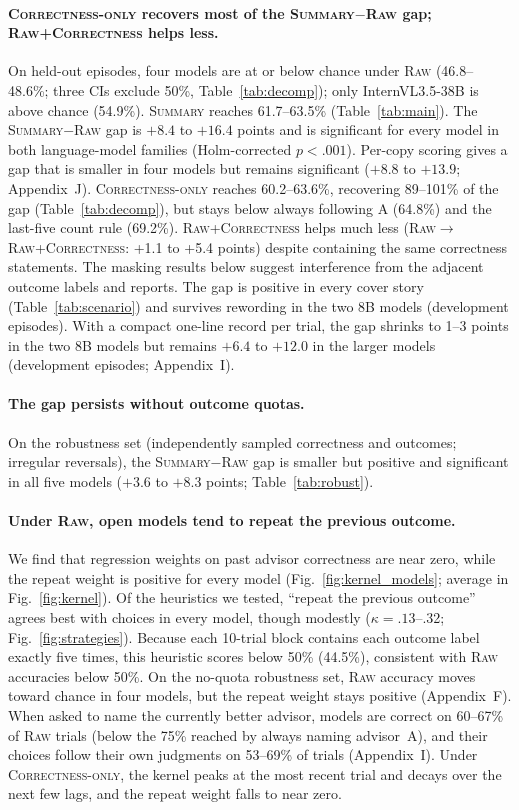 \documentclass[letterpaper]{article} %
\newcommand{\Raw}{\textsc{Raw}}
\newcommand{\RawCorrectness}{\textsc{Raw+Correctness}}
\newcommand{\CorrectnessOnly}{\textsc{Correctness-only}}
\newcommand{\Summary}{\textsc{Summary}}
\begin{document}
\paragraph{\CorrectnessOnly{} recovers most of the \Summary{}$-$\Raw{} gap; \RawCorrectness{} helps less.} On held-out episodes, four models are at or below chance under \Raw{} (46.8--48.6\%; three CIs exclude 50\%, Table~\ref{tab:decomp}); only InternVL3.5-38B is above chance (54.9\%). \Summary{} reaches 61.7--63.5\% (Table~\ref{tab:main}). The \Summary{}$-$\Raw{} gap is $+8.4$ to $+16.4$ points and is significant for every model in both language-model families (Holm-corrected $p<.001$). Per-copy scoring gives a gap that is smaller in four models but remains significant ($+8.8$ to $+13.9$; Appendix~J). \CorrectnessOnly{} reaches 60.2--63.6\%, recovering 89--101\% of the gap (Table~\ref{tab:decomp}), but stays below always following A (64.8\%) and the last-five count rule (69.2\%). \RawCorrectness{} helps much less (\Raw{}$\to$\RawCorrectness{}: +1.1 to +5.4 points) despite containing the same correctness statements. The masking results below suggest interference from the adjacent outcome labels and reports. The gap is positive in every cover story (Table~\ref{tab:scenario}) and survives rewording in the two 8B models (development episodes). With a compact one-line record per trial, the gap shrinks to 1--3 points in the two 8B models but remains $+6.4$ to $+12.0$ in the larger models (development episodes; Appendix~I).

\paragraph{The gap persists without outcome quotas.} On the robustness set (independently sampled correctness and outcomes; irregular reversals), the \Summary{}$-$\Raw{} gap is smaller but positive and significant in all five models ($+3.6$ to $+8.3$ points; Table~\ref{tab:robust}).

\paragraph{Under \Raw{}, open models tend to repeat the previous outcome.} We find that regression weights on past advisor correctness are near zero, while the repeat weight is positive for every model (Fig.~\ref{fig:kernel_models}; average in Fig.~\ref{fig:kernel}). Of the heuristics we tested, ``repeat the previous outcome'' agrees best with choices in every model, though modestly ($\kappa=.13$--.32; Fig.~\ref{fig:strategies}). Because each 10-trial block contains each outcome label exactly five times, this heuristic scores below 50\% (44.5\%), consistent with \Raw{} accuracies below 50\%. On the no-quota robustness set, \Raw{} accuracy moves toward chance in four models, but the repeat weight stays positive (Appendix~F). When asked to name the currently better advisor, models are correct on 60--67\% of \Raw{} trials (below the 75\% reached by always naming advisor~A), and their choices follow their own judgments on 53--69\% of trials (Appendix~I). Under \CorrectnessOnly{}, the kernel peaks at the most recent trial and decays over the next few lags, and the repeat weight falls to near zero.
\end{document}
